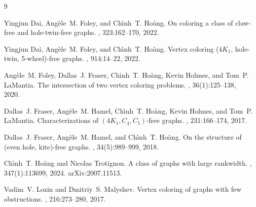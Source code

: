 \documentclass[12pt]{article}
\begin{document}
\begin{thebibliography}{9}
	
	Yingjun Dai, Ang{\`{e}}le~M. Foley, and Ch{\'{\i}}nh~T. Ho{\`{a}}ng.
	\newblock On coloring a class of claw-free and hole-twin-free graphs.
	, 323:162--170, 2022.
	
	Yingjun Dai, Ang{\`{e}}le~M. Foley, and Ch{\'{\i}}nh~T. Ho{\`{a}}ng.
	\newblock Vertex coloring ({$4K_1$}, hole-twin, 5-wheel)-free graphs.
	, 914:14--22, 2022.
	
	Ang{\`{e}}le~M. Foley, Dallas~J. Fraser, Ch{\'{\i}}nh~T. Ho{\`{a}}ng, Kevin
	Holmes, and Tom~P. LaMantia.
	\newblock The intersection of two vertex coloring problems.
	, 36(1):125--138, 2020.
	
	
	Dallas~J. Fraser, Ang{\`{e}}le~M. Hamel, Ch{\'{\i}}nh~T. Ho{\`{a}}ng, Kevin
	Holmes, and Tom~P. LaMantia.
	\newblock Characterizations of {$(4K_1, C_4, C_5)$}-free graphs.
	, 231:166--174, 2017.
	
	Dallas~J. Fraser, Ang{\`{e}}le~M. Hamel, and Ch{\'{\i}}nh~T. Ho{\`{a}}ng.
	\newblock On the structure of (even hole, kite)-free graphs.
	, 34(5):989--999, 2018.
	
	
	
	Ch{\'{\i}}nh~T. Ho{\`{a}}ng and Nicolas Trotignon.
	\newblock A class of graphs with large rankwidth.
	, 347(1):113699, 2024.
	\newblock arXiv:2007.11513.
	
	
	
	
	Vadim~V. Lozin and Dmitriy~S. Malyshev.
	\newblock Vertex coloring of graphs with few obstructions.
	, 216:273--280, 2017.
	
	
	

\end{thebibliography}
\end{document}
